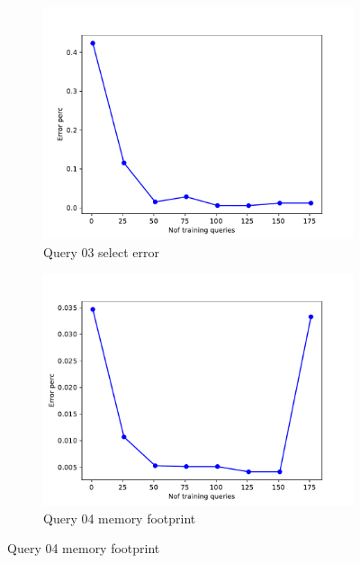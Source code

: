 \begin{figure}[!htb]
   \begin{subfigure}[t]{0.5\textwidth}
     \includegraphics[scale=0.4]{figs/tpch10/tpch10_sel03_error.pdf}
     \caption{Query 03 select error}
     \label{fig:tpch_sel03}
   \end{subfigure}
   \begin{subfigure}[t]{0.5\textwidth}
     \includegraphics[scale=0.4]{figs/tpch10/tpch10_sel04_error.pdf}
     \caption{Query 04 memory footprint}
     \label{fig:tpch_sel04}
    \end{subfigure}


\end{figure}

